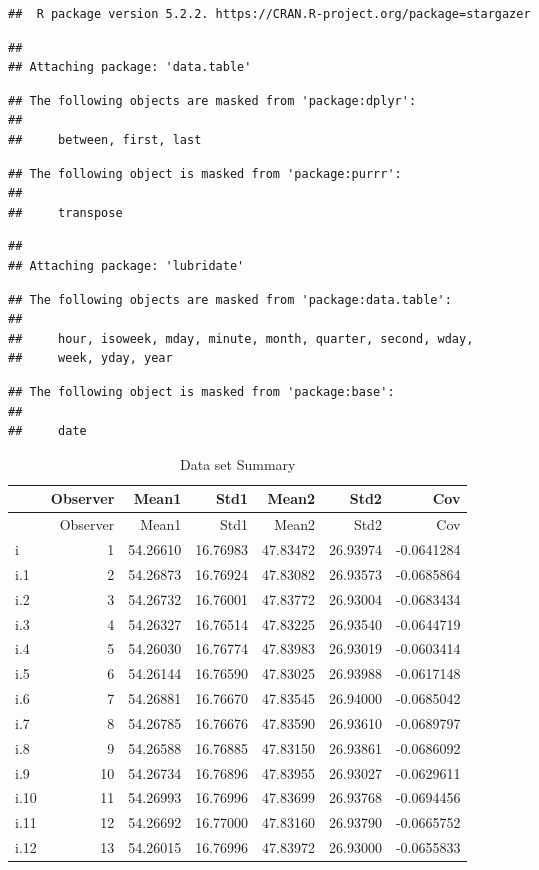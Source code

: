 \documentclass[]{article}
\begin{document}
\begin{verbatim}
##  R package version 5.2.2. https://CRAN.R-project.org/package=stargazer
\end{verbatim}

\begin{verbatim}
## 
## Attaching package: 'data.table'
\end{verbatim}

\begin{verbatim}
## The following objects are masked from 'package:dplyr':
## 
##     between, first, last
\end{verbatim}

\begin{verbatim}
## The following object is masked from 'package:purrr':
## 
##     transpose
\end{verbatim}

\begin{verbatim}
## 
## Attaching package: 'lubridate'
\end{verbatim}

\begin{verbatim}
## The following objects are masked from 'package:data.table':
## 
##     hour, isoweek, mday, minute, month, quarter, second, wday,
##     week, yday, year
\end{verbatim}

\begin{verbatim}
## The following object is masked from 'package:base':
## 
##     date
\end{verbatim}

\begin{longtable}[]{@{}lrrrrrr@{}}
\caption{Data set Summary}\tabularnewline
\toprule
& Observer & Mean1 & Std1 & Mean2 & Std2 & Cov\tabularnewline
\midrule
\endfirsthead
\toprule
& Observer & Mean1 & Std1 & Mean2 & Std2 & Cov\tabularnewline
\midrule
\endhead
i & 1 & 54.26610 & 16.76983 & 47.83472 & 26.93974 &
-0.0641284\tabularnewline
i.1 & 2 & 54.26873 & 16.76924 & 47.83082 & 26.93573 &
-0.0685864\tabularnewline
i.2 & 3 & 54.26732 & 16.76001 & 47.83772 & 26.93004 &
-0.0683434\tabularnewline
i.3 & 4 & 54.26327 & 16.76514 & 47.83225 & 26.93540 &
-0.0644719\tabularnewline
i.4 & 5 & 54.26030 & 16.76774 & 47.83983 & 26.93019 &
-0.0603414\tabularnewline
i.5 & 6 & 54.26144 & 16.76590 & 47.83025 & 26.93988 &
-0.0617148\tabularnewline
i.6 & 7 & 54.26881 & 16.76670 & 47.83545 & 26.94000 &
-0.0685042\tabularnewline
i.7 & 8 & 54.26785 & 16.76676 & 47.83590 & 26.93610 &
-0.0689797\tabularnewline
i.8 & 9 & 54.26588 & 16.76885 & 47.83150 & 26.93861 &
-0.0686092\tabularnewline
i.9 & 10 & 54.26734 & 16.76896 & 47.83955 & 26.93027 &
-0.0629611\tabularnewline
i.10 & 11 & 54.26993 & 16.76996 & 47.83699 & 26.93768 &
-0.0694456\tabularnewline
i.11 & 12 & 54.26692 & 16.77000 & 47.83160 & 26.93790 &
-0.0665752\tabularnewline
i.12 & 13 & 54.26015 & 16.76996 & 47.83972 & 26.93000 &
-0.0655833\tabularnewline
\bottomrule
\end{longtable}
\end{document}
